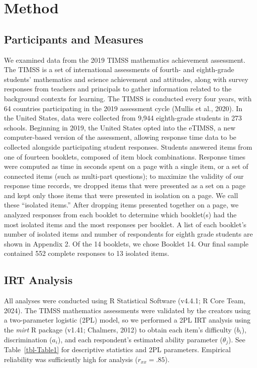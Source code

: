\documentclass[
  number]{elsarticle}
\begin{document}
\section{Method}\label{sec-method}

\subsection{Participants and Measures}\label{participants-and-measures}

We examined data from the 2019 TIMSS mathematics achievement assessment.
The TIMSS is a set of international assessments of fourth- and
eighth-grade students' mathematics and science achievement and
attitudes, along with survey responses from teachers and principals to
gather information related to the background contexts for learning. The
TIMSS is conducted every four years, with 64 countries participating in
the 2019 assessment cycle (Mullis et al., 2020). In the United States,
data were collected from 9,944 eighth-grade students in 273 schools.
Beginning in 2019, the United States opted into the eTIMSS, a new
computer-based version of the assessment, allowing response time data to
be collected alongside participating student responses. Students
answered items from one of fourteen booklets, composed of item block
combinations. Response times were computed as time in seconds spent on a
page with a single item, or a set of connected items (such as multi-part
questions); to maximize the validity of our response time records, we
dropped items that were presented as a set on a page and kept only those
items that were presented in isolation on a page. We call these
``isolated items.'' After dropping items presented together on a page,
we analyzed responses from each booklet to determine which booklet(s)
had the most isolated items and the most responses per booklet. A list
of each booklet's number of isolated items and number of respondents for
eighth grade students are shown in Appendix 2. Of the 14 booklets, we
chose Booklet 14. Our final sample contained 552 complete responses to
13 isolated items.

\subsection{IRT Analysis}\label{irt-analysis}

All analyses were conducted using R Statistical Software (v4.4.1; R Core
Team, 2024). The TIMSS mathematics assessments were validated by the
creators using a two-parameter logistic (2PL) model, so we performed a
2PL IRT analysis using the \emph{mirt} R package (v1.41; Chalmers, 2012)
to obtain each item's difficulty (\(b_i\)), discrimination (\(a_i\)),
and each respondent's estimated ability parameter (\(θ_j\)). See
Table~\ref{tbl-Table1} for descriptive statistics and 2PL parameters.
Empirical reliability was sufficiently high for analysis
(\(r_{xx} = .85\)).
\end{document}
